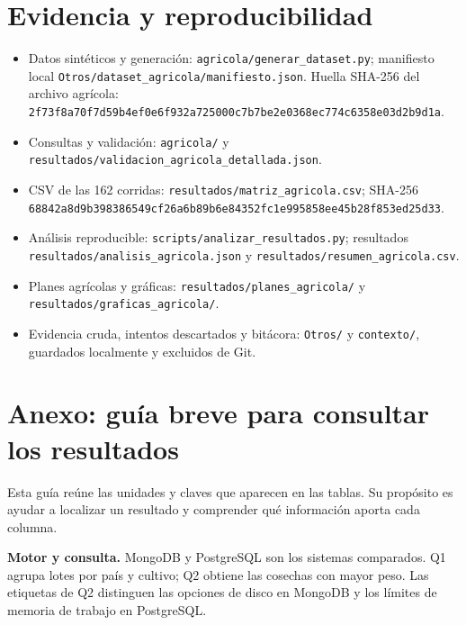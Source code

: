 \documentclass[12pt,letterpaper]{article}
\begin{document}
\clearpage\normalfont\sloppy\section*{Evidencia y reproducibilidad}
\begin{itemize}
\item Datos sintéticos y generación: \texttt{agricola/\allowbreak{}generar\_\allowbreak{}dataset.py}; manifiesto local \texttt{Otros/\allowbreak{}dataset\_\allowbreak{}agricola/\allowbreak{}manifiesto.json}. Huella SHA-256 del archivo agrícola: \texttt{2f73f8a70f7d59b4\allowbreak{}ef0e6f932a725000\allowbreak{}c7b7be2e0368ec77\allowbreak{}4c6358e03d2b9d1a}.
\item Consultas y validación: \texttt{agricola/\allowbreak{}} y \texttt{resultados/\allowbreak{}validacion\_\allowbreak{}agricola\_\allowbreak{}detallada.json}.
\item CSV de las 162 corridas: \texttt{resultados/\allowbreak{}matriz\_\allowbreak{}agricola.csv}; SHA-256 \texttt{68842a8d9b398386\allowbreak{}549cf26a6b89b6e8\allowbreak{}4352fc1e995858ee\allowbreak{}45b28f853ed25d33}.
\item Análisis reproducible: \texttt{scripts/\allowbreak{}analizar\_\allowbreak{}resultados.py}; resultados \texttt{resultados/\allowbreak{}analisis\_\allowbreak{}agricola.json} y \texttt{resultados/\allowbreak{}resumen\_\allowbreak{}agricola.csv}.
\item Planes agrícolas y gráficas: \texttt{resultados/\allowbreak{}planes\_\allowbreak{}agricola/\allowbreak{}} y \texttt{resultados/\allowbreak{}graficas\_\allowbreak{}agricola/\allowbreak{}}.
\item Evidencia cruda, intentos descartados y bitácora: \texttt{Otros/\allowbreak{}} y \texttt{contexto/\allowbreak{}}, guardados localmente y excluidos de Git.
\end{itemize}

\clearpage
\section*{Anexo: guía breve para consultar los resultados}
Esta guía reúne las unidades y claves que aparecen en las tablas. Su propósito es ayudar a localizar un resultado y comprender qué información aporta cada columna.

\textbf{Motor y consulta.} MongoDB y PostgreSQL son los sistemas comparados. Q1 agrupa lotes por país y cultivo; Q2 obtiene las cosechas con mayor peso. Las etiquetas de Q2 distinguen las opciones de disco en MongoDB y los límites de memoria de trabajo en PostgreSQL.
\end{document}
